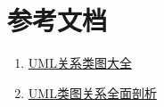 \section {\ZHH 参考文档} {
    \begin {enumerate}
    \item {\href{http://www.cnblogs.com/riky/archive/2007/04/07/704298.html}{UML关系类图大全} }
    \item {\href{http://blog.csdn.net/dylgsy/article/details/1076044}{UML类图关系全面剖析} }
    \end {enumerate}
}


